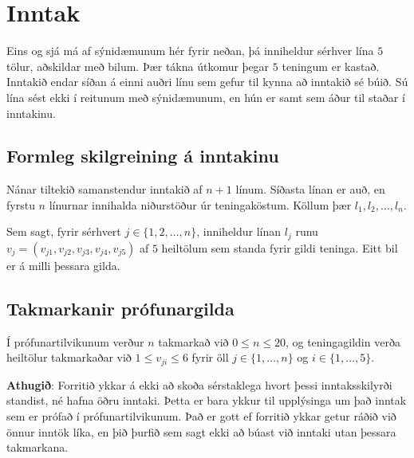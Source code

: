 \section*{Inntak}

Eins og sjá má af sýnidæmunum hér fyrir neðan,
þá inniheldur sérhver lína $5$ tölur, aðskildar með bilum.
Þær tákna útkomur þegar $5$ teningum er kastað.
Inntakið endar síðan á einni auðri línu
sem gefur til kynna að inntakið sé búið.
Sú lína sést ekki í reitunum með sýnidæmunum,
en hún er samt sem áður til staðar í inntakinu.

\subsection*{Formleg skilgreining á inntakinu}

Nánar tiltekið samanstendur inntakið af $n + 1$ línum.
Síðasta línan er auð, en fyrstu $n$ línurnar innihalda niðurstöður úr teningaköstum.
Köllum þær $l_1, l_2, \dots, l_n$.

Sem sagt, fyrir sérhvert $j\in \{1, 2, \dots, n\}$,
inniheldur línan $l_j$ runu $v_j=(v_{j1}, v_{j2}, v_{j3}, v_{j4}, v_{j5})$
af $5$ heiltölum sem standa fyrir gildi teninga.
Eitt bil er á milli þessara gilda.

\subsection*{Takmarkanir prófunargilda}

Í prófunartilvikunum verður $n$ takmarkað við $0\le n \le 20$,
og teningagildin verða heiltölur takmarkaðar við $1 \le v_{ji} \le 6$
fyrir öll $j\in \{1, \dots, n\}$ og $i\in \{1, \dots, 5\}$.

\textbf{Athugið}: Forritið ykkar á ekki að skoða sérstaklega hvort þessi inntaksskilyrði standist, né hafna öðru inntaki.
Þetta er bara ykkur til upplýsinga um það inntak sem er prófað í prófunartilvikunum. 
Það er gott ef forritið ykkar getur ráðið við önnur inntök líka,
en þið þurfið sem sagt ekki að búast við inntaki utan þessara takmarkana.


